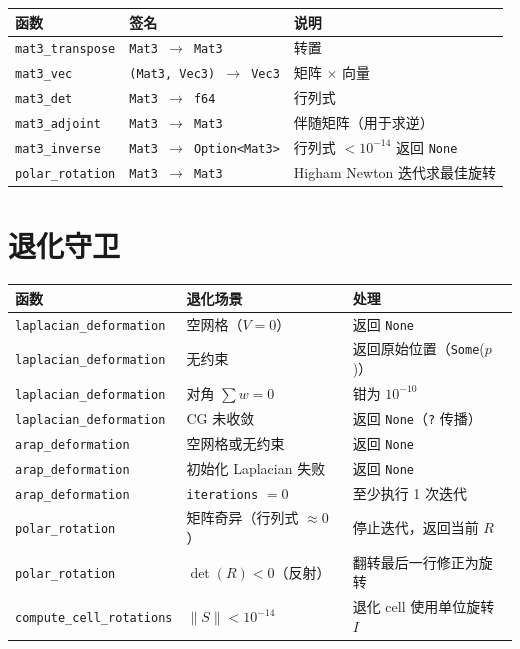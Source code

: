 \documentclass[11pt,a4paper]{article}
\begin{document}
\begin{center}
\renewcommand{\arraystretch}{1.18}
\begin{tabular}{@{}llp{8.2cm}@{}}
  \toprule
  \textbf{函数} & \textbf{签名} & \textbf{说明} \\
  \midrule
  \texttt{mat3\_transpose} & \texttt{Mat3 $\to$ Mat3} & 转置 \\
  \texttt{mat3\_vec}        & \texttt{(Mat3, Vec3) $\to$ Vec3} & 矩阵 $\times$ 向量 \\
  \texttt{mat3\_det}        & \texttt{Mat3 $\to$ f64} & 行列式 \\
  \texttt{mat3\_adjoint}    & \texttt{Mat3 $\to$ Mat3} & 伴随矩阵（用于求逆） \\
  \texttt{mat3\_inverse}    & \texttt{Mat3 $\to$ Option<Mat3>} & 行列式 $< 10^{-14}$ 返回 \texttt{None} \\
  \texttt{polar\_rotation}  & \texttt{Mat3 $\to$ Mat3} & Higham Newton 迭代求最佳旋转 \\
  \bottomrule
\end{tabular}
\end{center}

\section{退化守卫}

\begin{center}
\renewcommand{\arraystretch}{1.18}
\begin{tabular}{@{}lp{4.5cm}p{5.5cm}@{}}
  \toprule
  \textbf{函数} & \textbf{退化场景} & \textbf{处理} \\
  \midrule
  \texttt{laplacian\_deformation}
    & 空网格（$V = 0$） & 返回 \texttt{None} \\
  \texttt{laplacian\_deformation}
    & 无约束 & 返回原始位置（\texttt{Some}($p$)） \\
  \texttt{laplacian\_deformation}
    & 对角 $\sum w = 0$ & 钳为 $10^{-10}$ \\
  \texttt{laplacian\_deformation}
    & CG 未收敛 & 返回 \texttt{None}（\texttt{?} 传播） \\
  \midrule
  \texttt{arap\_deformation}
    & 空网格或无约束 & 返回 \texttt{None} \\
  \texttt{arap\_deformation}
    & 初始化 Laplacian 失败 & 返回 \texttt{None} \\
  \texttt{arap\_deformation}
    & \texttt{iterations} $= 0$ & 至少执行 1 次迭代 \\
  \midrule
  \texttt{polar\_rotation}
    & 矩阵奇异（行列式 $\approx 0$） & 停止迭代，返回当前 $R$ \\
  \texttt{polar\_rotation}
    & $\det(R) < 0$（反射） & 翻转最后一行修正为旋转 \\
  \texttt{compute\_cell\_rotations}
    & $\|S\| < 10^{-14}$ & 退化 cell 使用单位旋转 $I$ \\
  \bottomrule
\end{tabular}
\end{center}
\end{document}
